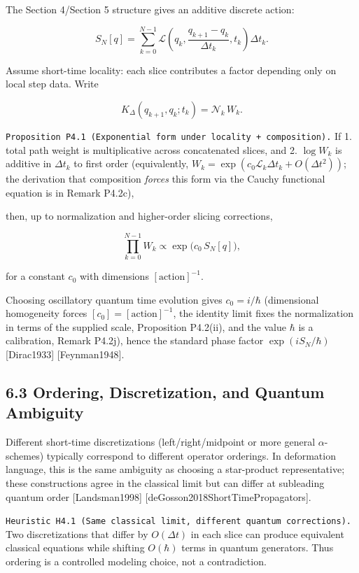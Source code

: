 \documentclass[
]{article}
\begin{document}
The Section 4/Section 5 structure gives an additive discrete action:

\[
S_N[q]=\sum_{k=0}^{N-1}\mathcal L\!\left(q_k,\frac{q_{k+1}-q_k}{\Delta t_k},t_k\right)\Delta t_k.
\]

Assume short-time locality: each slice contributes a factor depending
only on local step data. Write

\[
K_\Delta(q_{k+1},q_k;t_k)=\mathcal N_k\,W_k.
\]

\texttt{Proposition\ P4.1\ (Exponential\ form\ under\ locality\ +\ composition).}
If 1. total path weight is multiplicative across concatenated slices,
and 2. \(\log W_k\) is additive in \(\Delta t_k\) to first order
(equivalently,
\(W_k = \exp(c_0 \mathcal{L}_k \Delta t_k + O(\Delta t^2))\); the
derivation that composition \emph{forces} this form via the Cauchy
functional equation is in Remark P4.2c),

then, up to normalization and higher-order slicing corrections,

\[
\prod_{k=0}^{N-1}W_k
\propto
\exp\!\big(c_0\,S_N[q]\big),
\]

for a constant \(c_0\) with dimensions \([\text{action}]^{-1}\).

Choosing oscillatory quantum time evolution gives \(c_0=i/\hbar\)
(dimensional homogeneity forces \([c_0]=[\text{action}]^{-1}\), the
identity limit fixes the normalization in terms of the supplied scale,
Proposition P4.2(ii), and the value \(\hbar\) is a calibration, Remark
P4.2j), hence the standard phase factor \(\exp(iS_N/\hbar)\)
{[}Dirac1933{]} {[}Feynman1948{]}.

\subsection{6.3 Ordering, Discretization, and Quantum
Ambiguity}\label{ordering-discretization-and-quantum-ambiguity}

Different short-time discretizations (left/right/midpoint or more
general \(\alpha\)-schemes) typically correspond to different operator
orderings. In deformation language, this is the same ambiguity as
choosing a star-product representative; these constructions agree in the
classical limit but can differ at subleading quantum order
{[}Landsman1998{]} {[}deGosson2018ShortTimePropagators{]}.

\texttt{Heuristic\ H4.1\ (Same\ classical\ limit,\ different\ quantum\ corrections).}
Two discretizations that differ by \(O(\Delta t)\) in each slice can
produce equivalent classical equations while shifting \(O(\hbar)\) terms
in quantum generators. Thus ordering is a controlled modeling choice,
not a contradiction.
\end{document}
